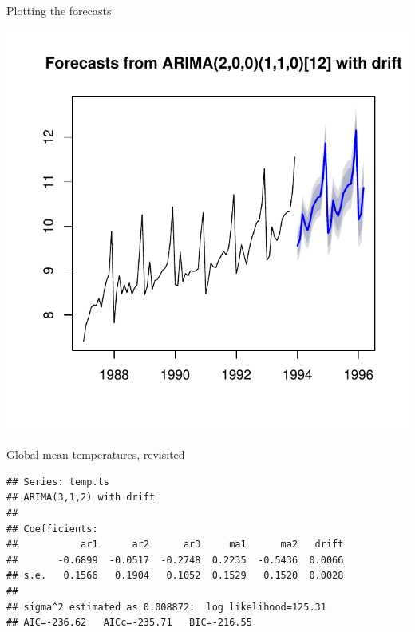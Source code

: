 \begin{frame}[fragile]{Plotting the forecasts}
  
\begin{knitrout}
\color{fgcolor}\begin{kframe}
\begin{alltt}
\end{alltt}
\end{kframe}
\includegraphics[width=\maxwidth]{figure/castleford-1} 

\end{knitrout}
  
\end{frame}

\begin{frame}[fragile]{Global mean temperatures, revisited}
  
\begin{knitrout}
\color{fgcolor}\begin{kframe}
\begin{alltt}
\hlkwb{=}\hlstd{=}\hlstd{)}
\hlkwb{=}
\end{alltt}
\begin{verbatim}
## Series: temp.ts 
## ARIMA(3,1,2) with drift         
## 
## Coefficients:
##           ar1      ar2      ar3     ma1      ma2   drift
##       -0.6899  -0.0517  -0.2748  0.2235  -0.5436  0.0066
## s.e.   0.1566   0.1904   0.1052  0.1529   0.1520  0.0028
## 
## sigma^2 estimated as 0.008872:  log likelihood=125.31
## AIC=-236.62   AICc=-235.71   BIC=-216.55
\end{verbatim}
\end{kframe}
\end{knitrout}
  
\end{frame}

